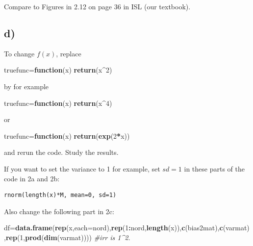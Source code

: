 \documentclass[]{article}
\newenvironment{Shaded}{\begin{snugshade}}{\end{snugshade}}
\newcommand{\KeywordTok}[1]{\textcolor[rgb]{0.13,0.29,0.53}{\textbf{#1}}}
\newcommand{\DataTypeTok}[1]{\textcolor[rgb]{0.13,0.29,0.53}{#1}}
\newcommand{\DecValTok}[1]{\textcolor[rgb]{0.00,0.00,0.81}{#1}}
\newcommand{\CommentTok}[1]{\textcolor[rgb]{0.56,0.35,0.01}{\textit{#1}}}
\newcommand{\ControlFlowTok}[1]{\textcolor[rgb]{0.13,0.29,0.53}{\textbf{#1}}}
\newcommand{\OperatorTok}[1]{\textcolor[rgb]{0.81,0.36,0.00}{\textbf{#1}}}
\newcommand{\NormalTok}[1]{#1}
\begin{document}
Compare to Figures in 2.12 on page 36 in ISL (our textbook).

\subsection{d)}\label{d}

To change \(f(x)\), replace

\begin{Shaded}
\begin{Highlighting}[]
\NormalTok{truefunc=}\ControlFlowTok{function}\NormalTok{(x) }\KeywordTok{return}\NormalTok{(x}\OperatorTok{^}\DecValTok{2}\NormalTok{)}
\end{Highlighting}
\end{Shaded}

by for example

\begin{Shaded}
\begin{Highlighting}[]
\NormalTok{truefunc=}\ControlFlowTok{function}\NormalTok{(x) }\KeywordTok{return}\NormalTok{(x}\OperatorTok{^}\DecValTok{4}\NormalTok{)}
\end{Highlighting}
\end{Shaded}

or

\begin{Shaded}
\begin{Highlighting}[]
\NormalTok{truefunc=}\ControlFlowTok{function}\NormalTok{(x) }\KeywordTok{return}\NormalTok{(}\KeywordTok{exp}\NormalTok{(}\DecValTok{2}\OperatorTok{*}\NormalTok{x))}
\end{Highlighting}
\end{Shaded}

and rerun the code. Study the results.

If you want to set the variance to 1 for example, set \(sd=1\) in these
parts of the code in 2a and 2b:

\begin{verbatim}
rnorm(length(x)*M, mean=0, sd=1)
\end{verbatim}

Also change the following part in 2c:

\begin{Shaded}
\begin{Highlighting}[]
\NormalTok{df=}\KeywordTok{data.frame}\NormalTok{(}\KeywordTok{rep}\NormalTok{(x,}\DataTypeTok{each=}\NormalTok{nord),}\KeywordTok{rep}\NormalTok{(}\DecValTok{1}\OperatorTok{:}\NormalTok{nord,}\KeywordTok{length}\NormalTok{(x)),}\KeywordTok{c}\NormalTok{(bias2mat),}\KeywordTok{c}\NormalTok{(varmat),}\KeywordTok{rep}\NormalTok{(}\DecValTok{1}\NormalTok{,}\KeywordTok{prod}\NormalTok{(}\KeywordTok{dim}\NormalTok{(varmat)))) }\CommentTok{#irr is 1^2.}
\end{Highlighting}
\end{Shaded}
\end{document}
